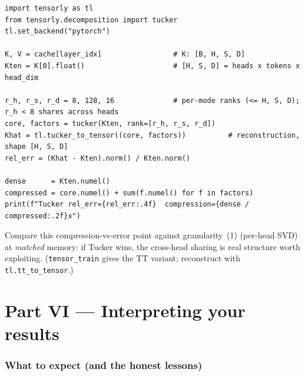 \documentclass[11pt]{article}
\newcommand{\code}[1]{\texttt{\small #1}}
\begin{document}
\begin{lstlisting}
import tensorly as tl
from tensorly.decomposition import tucker
tl.set_backend("pytorch")

K, V = cache[layer_idx]                 # K: [B, H, S, D]
Kten = K[0].float()                     # [H, S, D] = heads x tokens x head_dim

r_h, r_s, r_d = 8, 128, 16              # per-mode ranks (<= H, S, D); r_h < 8 shares across heads
core, factors = tucker(Kten, rank=[r_h, r_s, r_d])
Khat = tl.tucker_to_tensor((core, factors))          # reconstruction, shape [H, S, D]
rel_err = (Khat - Kten).norm() / Kten.norm()

dense      = Kten.numel()
compressed = core.numel() + sum(f.numel() for f in factors)
print(f"Tucker rel_err={rel_err:.4f}  compression={dense / compressed:.2f}x")
\end{lstlisting}
Compare this compression-vs-error point against granularity~(1) (per-head SVD) at \emph{matched}
memory: if Tucker wins, the cross-head sharing is real structure worth exploiting.
(\code{tensor\_train} gives the TT variant; reconstruct with \code{tl.tt\_to\_tensor}.)

\part*{Part VI \;---\; Interpreting your results}

\section{What to expect (and the honest lessons)}
\label{sec:expect}
\end{document}

